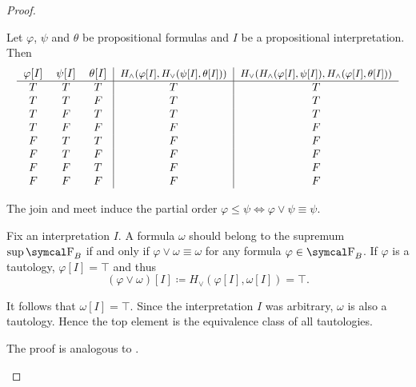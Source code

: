 \begin{proof}
\begin{RefList}
     Let \( \varphi \), \( \psi \) and \( \theta \) be propositional formulas and \( I \) be a propositional interpretation. Then
    \begin{equation*}
      \begin{tabular}{c c c | c | c}
        \( \varphi[I] \) & \( \psi[I] \) & \( \theta[I] \) & \small{\( H_\wedge(\varphi[I], H_\vee(\psi[I], \theta[I])) \)} & \small{\( H_\vee(H_\wedge(\varphi[I], \psi[I]), H_\wedge(\varphi[I], \theta[I])) \)} \\
        \hline
        \( T \)          & \( T \)       & \( T \)         & \( T \)                                               & \( T \)    \\
        \( T \)          & \( T \)       & \( F \)         & \( T \)                                               & \( T \)    \\
        \( T \)          & \( F \)       & \( T \)         & \( T \)                                               & \( T \)    \\
        \( T \)          & \( F \)       & \( F \)         & \( F \)                                               & \( F \)    \\
        \( F \)          & \( T \)       & \( T \)         & \( F \)                                               & \( F \)    \\
        \( F \)          & \( T \)       & \( F \)         & \( F \)                                               & \( F \)    \\
        \( F \)          & \( F \)       & \( T \)         & \( F \)                                               & \( F \)    \\
        \( F \)          & \( F \)       & \( F \)         & \( F \)                                               & \( F \)
      \end{tabular}
    \end{equation*}
  \end{RefList}

  The join and meet induce the partial order \( \varphi \leq \psi \iff \varphi \vee \psi \equiv \psi \).

  \begin{RefList}
     Fix an interpretation \( I \). A formula \( \omega \) should belong to the supremum \( \sup \CF_B \) if and only if \( \varphi \vee \omega \equiv \omega \) for any formula \( \varphi \in \CF_B \). If \( \varphi \) is a tautology, \( \varphi[I] = \top \) and thus
    \begin{equation*}
      (\varphi \vee \omega)[I] \coloneqq H_\vee(\varphi[I], \omega[I]) = \top.
    \end{equation*}

    It follows that \( \omega[I] = \top \). Since the interpretation \( I \) was arbitrary, \( \omega \) is also a tautology. Hence the top element is the equivalence class of all tautologies.

     The proof is analogous to .
  \end{RefList}
\end{proof}

